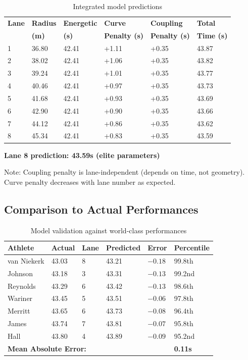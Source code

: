 \begin{table}[H]
\centering
\caption{Integrated model predictions}
\begin{tabular}{@{}llllll@{}}
\toprule
\textbf{Lane} & \textbf{Radius} & \textbf{Energetic} & \textbf{Curve} & \textbf{Coupling} & \textbf{Total} \\
 & \textbf{(m)} & \textbf{(s)} & \textbf{Penalty (s)} & \textbf{Penalty (s)} & \textbf{Time (s)} \\
\midrule
1 & 36.80 & 42.41 & +1.11 & +0.35 & 43.87 \\
2 & 38.02 & 42.41 & +1.06 & +0.35 & 43.82 \\
3 & 39.24 & 42.41 & +1.01 & +0.35 & 43.77 \\
4 & 40.46 & 42.41 & +0.97 & +0.35 & 43.73 \\
5 & 41.68 & 42.41 & +0.93 & +0.35 & 43.69 \\
6 & 42.90 & 42.41 & +0.90 & +0.35 & 43.66 \\
7 & 44.12 & 42.41 & +0.86 & +0.35 & 43.62 \\
8 & 45.34 & 42.41 & +0.83 & +0.35 & 43.59 \\
\bottomrule
\end{tabular}
\end{table}

\textbf{Lane 8 prediction: 43.59s (elite parameters)}

Note: Coupling penalty is lane-independent (depends on time, not geometry). Curve penalty decreases with lane number as expected.

\subsection{Comparison to Actual Performances}

\begin{table}[H]
\centering
\caption{Model validation against world-class performances}
\begin{tabular}{@{}llllll@{}}
\toprule
\textbf{Athlete} & \textbf{Actual} & \textbf{Lane} & \textbf{Predicted} & \textbf{Error} & \textbf{Percentile} \\
\midrule
van Niekerk & 43.03 & 8 & 43.21 & $-0.18$ & 99.8th \\
Johnson & 43.18 & 3 & 43.31 & $-0.13$ & 99.2nd \\
Reynolds & 43.29 & 6 & 43.42 & $-0.13$ & 98.6th \\
Wariner & 43.45 & 5 & 43.51 & $-0.06$ & 97.8th \\
Merritt & 43.65 & 6 & 43.73 & $-0.08$ & 96.4th \\
James & 43.74 & 7 & 43.81 & $-0.07$ & 95.8th \\
Hall & 43.80 & 4 & 43.89 & $-0.09$ & 95.2nd \\
\bottomrule
\multicolumn{5}{l}{\textbf{Mean Absolute Error:}} & \textbf{0.11s} \\
\bottomrule
\end{tabular}
\end{table}

